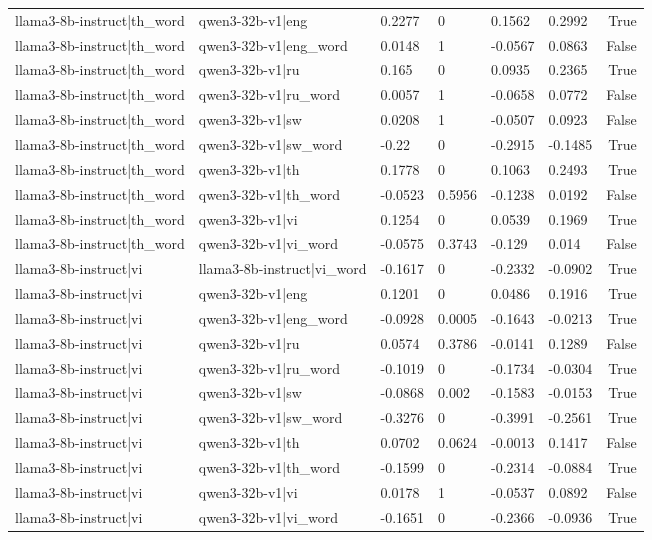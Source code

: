 \begin{table}
\begin{tabular}{llllllr}
llama3-8b-instruct|th_word & qwen3-32b-v1|eng & 0.2277 & 0 & 0.1562 & 0.2992 & True \\
llama3-8b-instruct|th_word & qwen3-32b-v1|eng_word & 0.0148 & 1 & -0.0567 & 0.0863 & False \\
llama3-8b-instruct|th_word & qwen3-32b-v1|ru & 0.165 & 0 & 0.0935 & 0.2365 & True \\
llama3-8b-instruct|th_word & qwen3-32b-v1|ru_word & 0.0057 & 1 & -0.0658 & 0.0772 & False \\
llama3-8b-instruct|th_word & qwen3-32b-v1|sw & 0.0208 & 1 & -0.0507 & 0.0923 & False \\
llama3-8b-instruct|th_word & qwen3-32b-v1|sw_word & -0.22 & 0 & -0.2915 & -0.1485 & True \\
llama3-8b-instruct|th_word & qwen3-32b-v1|th & 0.1778 & 0 & 0.1063 & 0.2493 & True \\
llama3-8b-instruct|th_word & qwen3-32b-v1|th_word & -0.0523 & 0.5956 & -0.1238 & 0.0192 & False \\
llama3-8b-instruct|th_word & qwen3-32b-v1|vi & 0.1254 & 0 & 0.0539 & 0.1969 & True \\
llama3-8b-instruct|th_word & qwen3-32b-v1|vi_word & -0.0575 & 0.3743 & -0.129 & 0.014 & False \\
llama3-8b-instruct|vi & llama3-8b-instruct|vi_word & -0.1617 & 0 & -0.2332 & -0.0902 & True \\
llama3-8b-instruct|vi & qwen3-32b-v1|eng & 0.1201 & 0 & 0.0486 & 0.1916 & True \\
llama3-8b-instruct|vi & qwen3-32b-v1|eng_word & -0.0928 & 0.0005 & -0.1643 & -0.0213 & True \\
llama3-8b-instruct|vi & qwen3-32b-v1|ru & 0.0574 & 0.3786 & -0.0141 & 0.1289 & False \\
llama3-8b-instruct|vi & qwen3-32b-v1|ru_word & -0.1019 & 0 & -0.1734 & -0.0304 & True \\
llama3-8b-instruct|vi & qwen3-32b-v1|sw & -0.0868 & 0.002 & -0.1583 & -0.0153 & True \\
llama3-8b-instruct|vi & qwen3-32b-v1|sw_word & -0.3276 & 0 & -0.3991 & -0.2561 & True \\
llama3-8b-instruct|vi & qwen3-32b-v1|th & 0.0702 & 0.0624 & -0.0013 & 0.1417 & False \\
llama3-8b-instruct|vi & qwen3-32b-v1|th_word & -0.1599 & 0 & -0.2314 & -0.0884 & True \\
llama3-8b-instruct|vi & qwen3-32b-v1|vi & 0.0178 & 1 & -0.0537 & 0.0892 & False \\
llama3-8b-instruct|vi & qwen3-32b-v1|vi_word & -0.1651 & 0 & -0.2366 & -0.0936 & True \\

\end{tabular}
\end{table}
